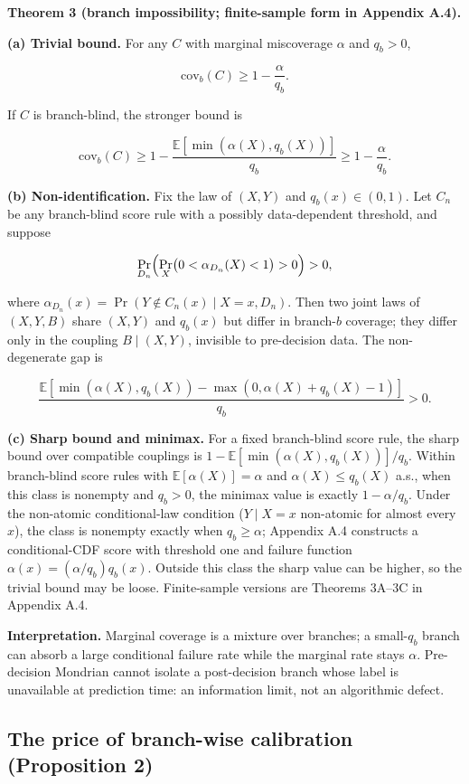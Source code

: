 \textbf{Theorem 3 (branch impossibility; finite-sample form in Appendix A.4).}

\textbf{(a) Trivial bound.} For any $C$ with marginal miscoverage $\alpha$ and $q_b>0$,

\[
\mathrm{cov}_b(C)\ge1-\frac{\alpha}{q_b}.
\]

If $C$ is branch-blind, the stronger bound is

\[
\mathrm{cov}_b(C)\ge1-\frac{\mathbb E[\min(\alpha(X),q_b(X))]}{q_b}\ge1-\frac{\alpha}{q_b}.
\]

\textbf{(b) Non-identification.} Fix the law of $(X,Y)$ and $q_b(x)\in(0,1)$. Let $C_n$ be any branch-blind score rule with a possibly data-dependent threshold, and suppose

\[
\Pr_{D_n}\Bigl(\Pr_X\bigl(0<\alpha_{D_n}(X)<1\bigr)>0\Bigr)>0,
\]

where $\alpha_{D_n}(x)=\Pr(Y\notin C_n(x)\mid X=x,D_n)$. Then two joint laws of $(X,Y,B)$ share $(X,Y)$ and $q_b(x)$ but differ in branch-$b$ coverage; they differ only in the coupling $B\mid(X,Y)$, invisible to pre-decision data. The non-degenerate gap is

\[
\frac{\mathbb E[\min(\alpha(X),q_b(X))-\max(0,\alpha(X)+q_b(X)-1)]}{q_b}>0.
\]

\textbf{(c) Sharp bound and minimax.} For a fixed branch-blind score rule, the sharp bound over compatible couplings is $1-\mathbb E[\min(\alpha(X),q_b(X))]/q_b$. Within branch-blind score rules with $\mathbb E[\alpha(X)]=\alpha$ and $\alpha(X)\le q_b(X)$ a.s., when this class is nonempty and $q_b>0$, the minimax value is exactly $1-\alpha/q_b$. Under the non-atomic conditional-law condition ($Y\mid X=x$ non-atomic for almost every $x$), the class is nonempty exactly when $q_b\ge\alpha$; Appendix A.4 constructs a conditional-CDF score with threshold one and failure function $\alpha(x)=(\alpha/q_b)q_b(x)$. Outside this class the sharp value can be higher, so the trivial bound may be loose. Finite-sample versions are Theorems 3A--3C in Appendix A.4.

\textbf{Interpretation.} Marginal coverage is a mixture over branches; a small-$q_b$ branch can absorb a large conditional failure rate while the marginal rate stays $\alpha$. Pre-decision Mondrian cannot isolate a post-decision branch whose label is unavailable at prediction time: an information limit, not an algorithmic defect.

\subsection{The price of branch-wise calibration (Proposition 2)}

